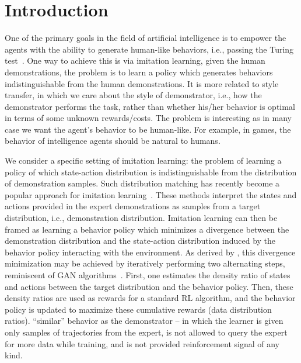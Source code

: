 \section{Introduction}
One of the primary goals in the field of artificial intelligence is to empower the agents with the ability to generate human-like behaviors, i.e., passing the Turing test~\citep{saygin2000turing}.
One way to achieve this is via imitation learning, given the human demonstrations, 
the problem is to learn a policy which generates behaviors indistinguishable from the human demonstrations. 
It is more related to style transfer, in which we care about the style of demonstrator, i.e., how the demonstrator performs the task, rather than whether his/her behavior is optimal in terms of some unknown rewards/costs. 
The problem is interesting as in many case we want the agent's behavior to be human-like. 
For example, in games, the behavior of intelligence agents should be natural to humans. 


We consider a specific setting of imitation learning:
the problem of learning a policy of which state-action distribution is indistinguishable from the distribution of demonstration samples. 
Such distribution matching has recently become a popular approach for imitation learning~\citep{ho2016generative,ke2019imitation,kostrikov2019imitation}.
These methods interpret the states and actions provided in the expert demonstrations as samples from a target distribution, i.e., demonstration distribution.
Imitation learning can then be framed as learning a behavior policy which minimizes a divergence between the demonstration distribution and the state-action distribution induced by the behavior policy interacting with the environment. 
As derived by \citet{ho2016generative}, this divergence minimization may be achieved by iteratively performing two alternating steps, reminiscent of GAN algorithms~\citep{goodfellow2014generative}. 
First, one estimates the density ratio of states and actions between the target distribution and the behavior policy. 
Then, these density ratios are used as rewards for a standard RL algorithm, and the behavior policy is updated to maximize these cumulative rewards (data distribution ratios).
``similar'' behavior as the demonstrator -- 
in which the learner is given only samples of trajectories from the expert, 
is not allowed to query the expert for more data while training, 
and is not provided reinforcement signal of any kind. 



